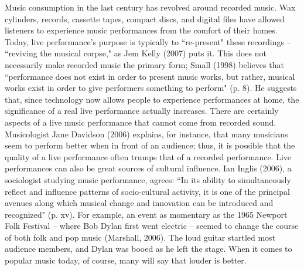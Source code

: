 Music consumption in the last century has revolved around recorded music. Wax cylinders, records, cassette tapes, compact discs, and digital files have allowed listeners to experience music performances from the comfort of their homes. Today, live performance's purpose is typically to ``re-present" these recordings -- ``reviving the musical corpse," as Jem Kelly (2007) puts it. This does not necessarily make recorded music the primary form; Small (1998) believes that ``performance does not exist in order to present music works, but rather, musical works exist in order to give performers something to perform" (p. 8). He suggests that, since technology now allows people to experience performances at home, the significance of a real live performance actually increases. There are certainly aspects of a live music performance that cannot come from recorded sound. Musicologist Jane Davidson (2006) explains, for instance, that many musicians seem to perform better when in front of an audience; thus, it is possible that the quality of a live performance often trumps that of a recorded performance. Live performances can also be great sources of cultural influence. Ian Inglis (2006), a sociologist studying music performance, agrees: ``In its ability to simultaneously reflect and influence patterns of socio-cultural activity, it is one of the principal avenues along which musical change and innovation can be introduced and recognized" (p. xv). For example, an event as momentary as the 1965 Newport Folk Festival -- where Bob Dylan first went electric -- seemed to change the course of both folk and pop music (Marshall, 2006). The loud guitar startled most audience members, and Dylan was booed as he left the stage. When it comes to popular music today, of course, many will say that louder is better.

